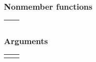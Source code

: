 \documentclass[letterpaper,10pt,english]{sphinxmanual}
\begin{document}
\subsubsection*{Non\sphinxhyphen{}member functions}


\begin{savenotes}\sphinxattablestart
\centering
\begin{tabulary}{\linewidth}[t]{|T|T|}
\hline

{\hyperref[\detokenize{programming-interface/runtime/device:get-devices}]{}}
&\\
\hline
\end{tabulary}
\par
\sphinxattableend\end{savenotes}


\paragraph{}
\label{\detokenize{programming-interface/runtime/device:constructor}}
\begin{sphinxVerbatim}[commandchars=\\\{\}]
  
   
\end{sphinxVerbatim}
\subsubsection*{Arguments}


\begin{savenotes}\sphinxattablestart
\centering
\begin{tabulary}{\linewidth}[t]{|T|T|}
\hline

&\\
\hline
{}
&\\
\hline
\end{tabulary}
\par
\sphinxattableend\end{savenotes}


\paragraph{}
\label{\detokenize{programming-interface/runtime/device:get}}
\begin{sphinxVerbatim}[commandchars=\\\{\}]
  
\end{sphinxVerbatim}
\end{document}
